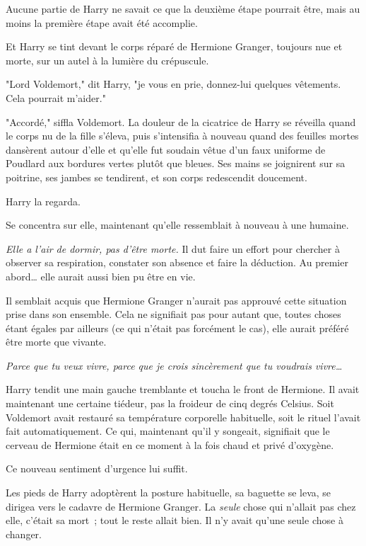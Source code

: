 Aucune partie de Harry ne savait ce que la deuxième étape pourrait être, mais au moins la première étape avait été accomplie.

Et Harry se tint devant le corps réparé de Hermione Granger, toujours nue et morte, sur un autel à la lumière du crépuscule.

"Lord Voldemort," dit Harry, "je vous en prie, donnez-lui quelques vêtements. Cela pourrait m'aider."

"Accordé," siffla Voldemort. La douleur de la cicatrice de Harry se réveilla quand le corps nu de la fille s'éleva, puis s'intensifia à nouveau quand des feuilles mortes dansèrent autour d'elle et qu'elle fut soudain vêtue d'un faux uniforme de Poudlard aux bordures vertes plutôt que bleues. Ses mains se joignirent sur sa poitrine, ses jambes se tendirent, et son corps redescendit doucement.

Harry la regarda.

Se concentra sur elle, maintenant qu'elle ressemblait à nouveau à une humaine.

\emph{Elle a l'air de dormir, pas d'être morte.} Il dut faire un effort pour chercher à observer sa respiration, constater son absence et faire la déduction. Au premier abord… elle aurait aussi bien pu être en vie.

Il semblait acquis que Hermione Granger n'aurait pas approuvé cette situation prise dans son ensemble. Cela ne signifiait pas pour autant que, toutes choses étant égales par ailleurs (ce qui n'était pas forcément le cas), elle aurait préféré être morte que vivante.

\emph{Parce que tu veux vivre, parce que je crois sincèrement que tu voudrais vivre…}

Harry tendit une main gauche tremblante et toucha le front de Hermione. Il avait maintenant une certaine tiédeur, pas la froideur de cinq degrés Celsius. Soit Voldemort avait restauré sa température corporelle habituelle, soit le rituel l'avait fait automatiquement. Ce qui, maintenant qu'il y songeait, signifiait que le cerveau de Hermione était en ce moment à la fois chaud et privé d'oxygène.

Ce nouveau sentiment d'urgence lui suffit.

Les pieds de Harry adoptèrent la posture habituelle, sa baguette se leva, se dirigea vers le cadavre de Hermione Granger. La \emph{seule} chose qui n'allait pas chez elle, c'était sa mort~; tout le reste allait bien. Il n'y avait qu'une seule chose à changer.

